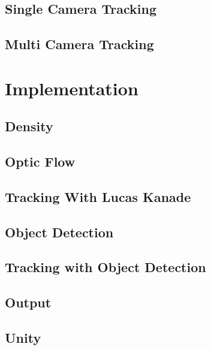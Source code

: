 \documentclass[conference]{IEEEtran}
\begin{document}
\subsection{Single Camera Tracking}

\subsection{Multi Camera Tracking}

\section{Implementation}

\subsection{Density}

\subsection{Optic Flow}

\subsection{Tracking With Lucas Kanade}

\subsection{Object Detection}

\subsection{Tracking with Object Detection}

\subsection{Output}

\subsection{Unity}
\end{document}
